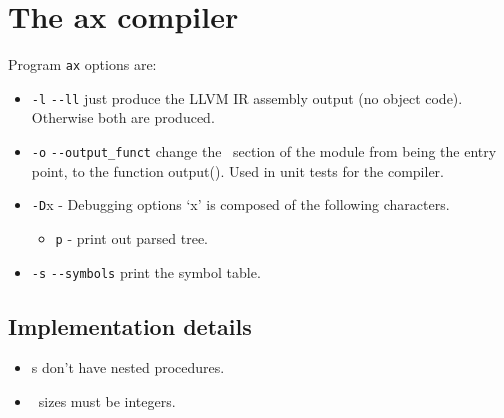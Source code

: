 \documentclass[12pt]{article}
\begin{document}
\newpage
\section{The ax compiler}

Program \lstinline"ax" options are: 
\begin{itemize}
    \item \lstinline"-l" \lstinline"--ll" just produce the LLVM IR assembly output (no object code). Otherwise both are produced.
    \item \lstinline"-o" \lstinline"--output_funct" change the \BEGIN\ section of the module from being the entry point, to the function output(). Used in unit tests for the compiler.
    \item \lstinline"-D"x - Debugging options `x' is composed of the following characters.
    \begin{itemize}
        \item \lstinline"p" - print out parsed tree.
    \end{itemize}
    \item \lstinline"-s" \lstinline"--symbols" print the symbol table.
\end{itemize}

\subsection{Implementation details}
\begin{itemize}
    \item \PROCEDURE s don't have nested procedures.
    \item \ARRAY\ sizes must be integers.
\end{itemize}
\end{document}
